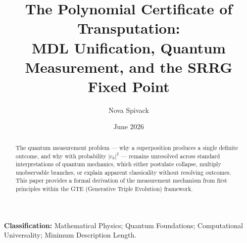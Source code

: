 \documentclass[11pt]{article}
\theoremstyle{remark}
\begin{document}
\title{\textbf{The Polynomial Certificate of Transputation:\\
MDL Unification, Quantum Measurement, and the SRRG Fixed Point}}

\author{Nova Spivack}
\date{June 2026}
\maketitle

\NovaZenodoAfterTitle

\noindent\textbf{Classification:} Mathematical Physics; Quantum Foundations;
Computational Universality; Minimum Description Length.

\begin{abstract}
The quantum measurement problem --- why a superposition produces a single
definite outcome, and why with probability $|c_k|^2$ --- remains unresolved
across standard interpretations of quantum mechanics, which either postulate
collapse, multiply unobservable branches, or explain apparent classicality
without resolving outcomes.
This paper provides a formal derivation of the measurement mechanism from
first principles within the GTE (Generative Triple Evolution) framework.


\end{abstract}
\end{document}
